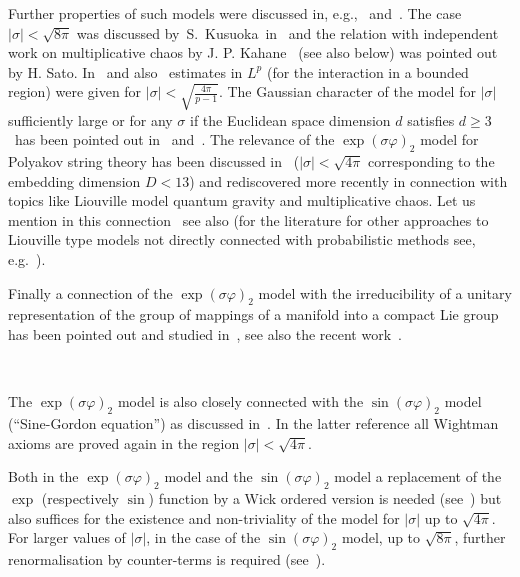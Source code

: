 \documentclass[a4paper,10pt]{article}
\begin{document}
Further properties of such models were discussed in,
e.g.,~{\cite{AHiPRoS2,AHiPRoS1,FroPa,Gie,HiKPS,Simon1974}}
and~{\cite{Albeverio2002,AlHKa,AFeHKL,AlLi,Liang}}. The case $| \sigma | <
\sqrt{8 \pi}$ was discussed by~S.~Kusuoka~in~{\cite{Ku}} and the relation with
independent work on multiplicative chaos by J. P. Kahane~{\cite{Ka}} (see also
below) was pointed out by H. Sato. In~{\cite{AHK2}} and
also~{\cite{Simon1974}} estimates in $L^p$ (for the interaction in a bounded
region) were given for $| \sigma | < \sqrt{\frac{4 \pi}{p - 1}}$. The Gaussian
character of the model for $| \sigma |$ sufficiently large or for any $\sigma$
if the Euclidean space dimension $d$ satisfies $d \geqslant 3$ \ has been
pointed out in~{\cite{AHK2}} and~{\cite{AGaHK}}. The relevance of the $\exp
(\sigma \varphi)_2$ model for Polyakov string theory has been discussed
in~{\cite{AlKrPaSc1986,AlKrPaSc1992,AJPS}} ($| \sigma | < \sqrt{4 \pi}$
corresponding to the embedding dimension $D < 13$) and rediscovered more
recently in connection with topics like Liouville model quantum gravity and
multiplicative chaos. Let us mention in this
connection~{\cite{AnKa,VaRhShe,RhVa}} see also
{\cite{BeShXi2014,DuSh2019,Gottschalk2013,Sha2016}} (for the literature for
other approaches to Liouville type models not directly connected with
probabilistic methods see, e.g.~{\cite{Bahns2018}}).

Finally a connection of the $\exp (\sigma \varphi)_2$ model with the
irreducibility of a unitary representation of the group of mappings of a
manifold into a compact Lie group has been pointed out and studied
in~{\cite{AHKMT}}, see also the recent work~{\cite{AGoVe}}.

\

The $\exp (\sigma \varphi)_2$ model is also closely connected with the $\sin
(\sigma \varphi)_2$ model (``Sine-Gordon equation'') as discussed
in~{\cite{AHK3,FrSei}}. In the latter reference all Wightman axioms are proved
again in the region $| \sigma | < \sqrt{4 \pi}$.

Both in the $\exp (\sigma \varphi)_2$ model and the $\sin (\sigma \varphi)_2$
model a replacement of the $\exp$ (respectively $\sin$) function by a Wick
ordered version is needed (see~{\cite{AHaRu}}) but also suffices for the
existence and non-triviality of the model for $| \sigma |$ up to $\sqrt{4
\pi}$. For larger values of $| \sigma |$, in the case of the $\sin (\sigma
\varphi)_2$ model, up to $\sqrt{8 \pi}$, further renormalisation by
counter-terms is required (see~{\cite{GaNi}}).
\end{document}
